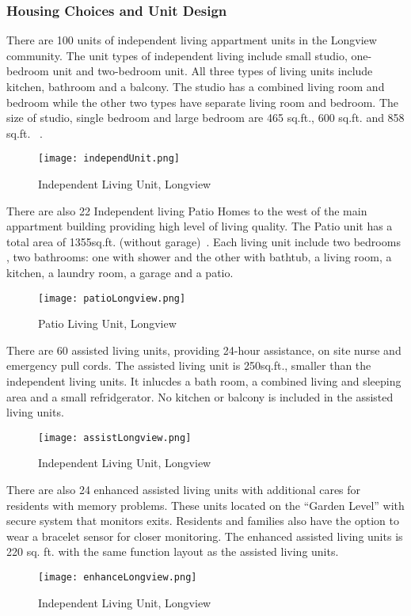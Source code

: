 \subsubsection{Housing Choices and Unit Design}
There are 100 units of independent living appartment units in the
Longview community. The unit types of independent living include small
studio, one-bedroom unit and two-bedroom unit. All three types of
living units include kitchen, bathroom and a balcony. The studio has a
combined living room and bedroom while the other two types have
separate living room and bedroom. The size of studio, single bedroom
and large bedroom are 465 sq.ft., 600 sq.ft. and 858
sq.ft. ~\cite{LongviewIndepend}.
\begin{figure}[htbp]
  \centering
  \texttt{[image: independUnit.png]}
  \caption[Independent Living Unit, Longview]{Independent Living
    Unit, Longview~\cite{LongviewIndepend}}
  \label{fig:independUnit}
\end{figure}

There are also 22 Independent living Patio Homes to the west of the
main appartment building providing high level of living
quality. The Patio unit has a total area of 1355sq.ft. (without
garage)~\cite{LongviewPatio}. Each living unit include two bedrooms ,
two bathrooms: one with shower and the other with bathtub, a living
room, a kitchen, a laundry room, a garage and a patio.
\begin{figure}[htbp]
  \centering
  \texttt{[image: patioLongview.png]}
  \caption[Patio Living Unit, Longview]{Patio Living
    Unit, Longview~\cite{patioLongview}}
  \label{fig:patioLongview}
\end{figure}

There are 60 assisted living units, providing 24-hour assistance, on 
site nurse and emergency pull cords. The assisted living unit is
250sq.ft., smaller than the independent living units. It inlucdes a
bath room, a combined living and sleeping area and a
small refridgerator. No kitchen or balcony is included in the assisted
living units.
\begin{figure}[htbp]
  \centering
  \texttt{[image: assistLongview.png]}
  \caption[Independent Living Unit, Longview]{Independent Living
    Unit, Longview~\cite{LongviewAssist}}
  \label{fig:assistLongview}
\end{figure}
There are also 24 enhanced assisted living units with additional cares
for residents with memory problems. These units located on the
``Garden Level'' with secure system that monitors exits. Residents
and families also have the option to wear a bracelet sensor for closer
monitoring. The enhanced assisted living units is 220 sq. ft. with the
same function layout as the assisted living units.
\begin{figure}[htbp]
  \centering
  \texttt{[image: enhanceLongview.png]}
  \caption[Independent Living Unit, Longview]{Independent Living
    Unit, Longview~\cite{enhanceLongview}}
  \label{fig:enhanceLongview}
\end{figure}
